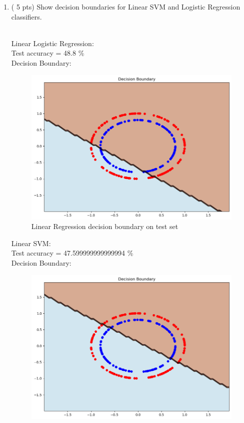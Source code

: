 \documentclass[a4paper]{article}
\theoremstyle{definition}
\newenvironment{soln}{
    \leavevmode\color{blue}\ignorespaces
}{}
\begin{document}
\begin{enumerate}
    \item ( 5 pts) Show decision boundaries for Linear SVM and Logistic Regression classifiers.
    \begin{soln}
        \\ {\fontsize{10pt}{12pt}\selectfont Linear Logistic Regression:} 
        \\ Test accuracy = 48.8 \%
        \\ Decision Boundary:
        \begin{figure}[H]
            \includegraphics[width=\textwidth]{images/circles-linear-lr.png}
            \caption{ Linear Regression decision boundary on test set}
        \end{figure}
        {\fontsize{10pt}{12pt}\selectfont Linear SVM:} 
        \\ Test accuracy = 47.599999999999994 \%
        \\ Decision Boundary:
        \begin{figure}[H]
            \includegraphics[width=\textwidth]{images/circles-linear-svm.png}

\end{figure}
\end{soln}
\end{enumerate}
\end{document}
